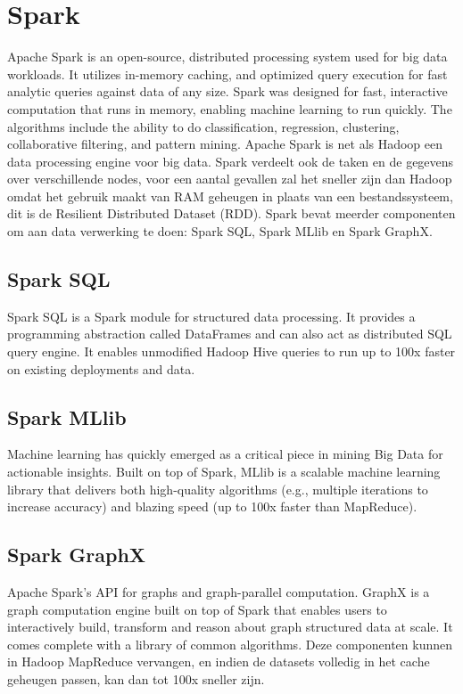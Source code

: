 \section{Spark}
Apache Spark is an open-source, distributed processing system used for big data workloads. It utilizes in-memory caching, and optimized query execution for fast analytic queries against data of any size.
Spark was designed for fast, interactive computation that runs in memory, enabling machine learning to run quickly. The algorithms include the ability to do classification, regression, clustering, collaborative filtering, and pattern mining.\autocite{AwsAmazon2023a}
\newline
\newline
Apache Spark is net als Hadoop een data processing engine voor big data. Spark verdeelt ook de taken en de gegevens over verschillende nodes, voor een aantal gevallen zal het sneller zijn dan Hadoop omdat het gebruik maakt van RAM geheugen in plaats van een bestandssysteem, dit is de Resilient Distributed Dataset (RDD).
\newline
\newline
Spark bevat meerder componenten om aan data verwerking te doen: Spark SQL, Spark MLlib en Spark GraphX.

\subsection{Spark SQL}
Spark SQL is a Spark module for structured data processing. It provides a programming abstraction called DataFrames and can also act as distributed SQL query engine. It enables unmodified Hadoop Hive queries to run up to 100x faster on existing deployments and data.\autocite{databricks2023}

\subsection{Spark MLlib}
Machine learning has quickly emerged as a critical piece in mining Big Data for actionable insights. Built on top of Spark, MLlib is a scalable machine learning library that delivers both high-quality algorithms (e.g., multiple iterations to increase accuracy) and blazing speed (up to 100x faster than MapReduce).\autocite{databricks2023}

\subsection{Spark GraphX}
Apache Spark's API for graphs and graph-parallel computation.
GraphX is a graph computation engine built on top of Spark that enables users to interactively build, transform and reason about graph structured data at scale. It comes complete with a library of common algorithms.\autocite{databricks2023}
\newline
\newline
Deze componenten kunnen in Hadoop MapReduce vervangen, en indien de datasets volledig in het cache geheugen passen, kan dan tot 100x sneller zijn.


